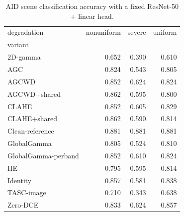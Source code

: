 \begin{table}[t]
\caption{AID scene classification accuracy with a fixed ResNet-50 + linear head.}
\label{tab:downstream_accuracy}
\begin{tabular}{lrrr}
\toprule
degradation & nonuniform & severe & uniform \\
variant &  &  &  \\
\midrule
2D-gamma & 0.652 & 0.390 & 0.610 \\
AGC & 0.824 & 0.543 & 0.805 \\
AGCWD & 0.852 & 0.624 & 0.824 \\
AGCWD+shared & 0.862 & 0.595 & 0.800 \\
CLAHE & 0.852 & 0.605 & 0.829 \\
CLAHE+shared & 0.862 & 0.590 & 0.814 \\
Clean-reference & 0.881 & 0.881 & 0.881 \\
GlobalGamma & 0.805 & 0.524 & 0.810 \\
GlobalGamma-perband & 0.852 & 0.610 & 0.824 \\
HE & 0.795 & 0.595 & 0.814 \\
Identity & 0.857 & 0.581 & 0.838 \\
TASC-image & 0.710 & 0.343 & 0.638 \\
Zero-DCE & 0.833 & 0.624 & 0.857 \\
\bottomrule
\end{tabular}
\end{table}
